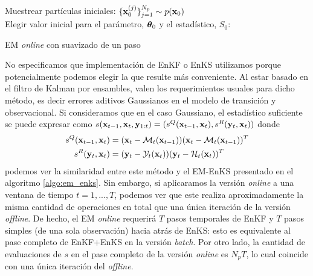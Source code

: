 \begin{algorithm}[H]\label{algo:onlineEM_OSS}
    
    Muestrear partículas iniciales: $\{\mathbf{x}_0^{(j)}\}_{j=1}^{N_p} \sim p(\mathbf{x}_0)$ \\
    Elegir valor inicial para el parámetro, $\mbox{\boldmath$ \theta $}_0$ y el estadístico, $\widehat{S_0}$: \\
    \caption{EM \textit{online} con suavizado de un paso}
\end{algorithm}
No especificamos que implementación de EnKF o EnKS utilizamos porque potencialmente podemos elegir la que resulte más conveniente. Al estar basado en el filtro de Kalman por ensambles, valen los requerimientos usuales para dicho método, es decir errores aditivos Gaussianos en el modelo de transición y observacional. Si consideramos que en el caso Gaussiano, el estadístico suficiente 
se puede expresar como $s(\mathbf{x}_{t-1}, \mathbf{x}_t, \mathbf{y}_{1:t}) = (s^Q(\mathbf{x}_{t-1}, \mathbf{x}_t), s^R(\mathbf{y}_t, \mathbf{x}_t))$ donde
\begin{align*}
    s^Q(\mathbf{x}_{t-1}, \mathbf{x}_t) &= (\mathbf{x}_t - \mathcal{M}_t(\mathbf{x}_{t-1}))(\mathbf{x}_t - \mathcal{M}_t(\mathbf{x}_{t-1}))^T \\
    s^R(\mathbf{y}_t, \mathbf{x}_t) &= (\mathbf{y}_t - \mathcal{Y}_t(\mathbf{x}_t))(\mathbf{y}_t - \mathcal{H}_t(\mathbf{x}_t))^T
\end{align*}
podemos ver la similaridad entre este método y el EM-EnKS presentado en el algoritmo \ref{algo:em_enks}. Sin embargo, si aplicaramos  la versión \textit{online} a una ventana de tiempo $t = 1, ..., T$, podemos ver que este realiza aproximadamente la misma cantidad de operaciones en total que una única iteración de la versión \textit{offline}. De hecho, el EM \textit{online} requerirá $T$ pasos temporales de EnKF y $T$ pasos simples (de una sola observación) hacia atrás de EnKS: esto es equivalente al pase completo de EnKF+EnKS en la versión \textit{batch}. Por otro lado, la cantidad de evaluaciones de $s$ en el pase completo de la versión \textit{online} es $N_pT$, lo cual coincide con una única iteración del \textit{offline}.
